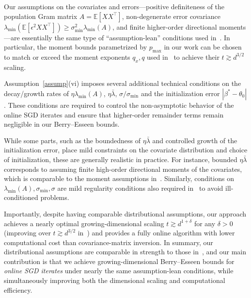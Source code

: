 \documentclass[11pt, reqno,english]{amsart}
\begin{document}
Our assumptions on the covariates and errors—positive definiteness of the population Gram matrix $A = \mathbb{E}[XX^\top]$, non-degenerate error covariance $\lambda_{\min}(\mathbb{E}[\epsilon^2 XX^\top]) \ge \sigma_{\min}^2 \lambda_{\min}(A)$, and finite higher-order directional moments—are essentially the same type of ``assumption-lean'' conditions used in~\cite{chang2023inference}. In particular, the moment bounds parametrized by $p_{\max}$ in our work can be chosen to match or exceed the moment exponents $q_x, q$ used in~\cite{chang2023inference} to achieve their $t \gtrsim d^{3/2}$ scaling. 

Assumption~\ref{assump}(vi) imposes several additional technical conditions on the decay/growth rates of $\eta\lambda_{\min}(A)$, $\eta\bar{\lambda}$, $\sigma/\sigma_{\min}$ and the initialization error $|\beta^* - \theta_0|$. These conditions are required to control the non-asymptotic behavior of the online SGD iterates and ensure that higher-order remainder terms remain negligible in our Berry--Esseen bounds. 

While some parts, such as the boundedness of $\eta\bar{\lambda}$ and controlled growth of the initialization error, place mild constraints on the covariate distribution and choice of initialization, these are generally realistic in practice. For instance, bounded $\eta\bar{\lambda}$ corresponds to assuming finite high-order directional moments of the covariates, which is comparable to the moment assumptions in~\cite{chang2023inference}. Similarly, conditions on $\lambda_{\min}(A), \sigma_{\min}, \sigma$ are mild regularity conditions also required in~\cite{chang2023inference} to avoid ill-conditioned problems. 

Importantly, despite having comparable distributional assumptions, our approach achieves a nearly optimal growing-dimensional scaling $t \gtrsim d^{1+\delta}$ for any $\delta>0$ (improving over $t \gtrsim d^{3/2}$ in~\cite{chang2023inference}) and provides a fully online algorithm with lower computational cost than covariance-matrix inversion. In summary, our distributional assumptions are comparable in strength to those in~\cite{chang2023inference}, and our main contribution is that we achieve growing-dimensional Berry--Esseen bounds for \emph{online SGD iterates} under nearly the same assumption-lean conditions, while simultaneously improving both the dimensional scaling and computational efficiency.
\end{document}
